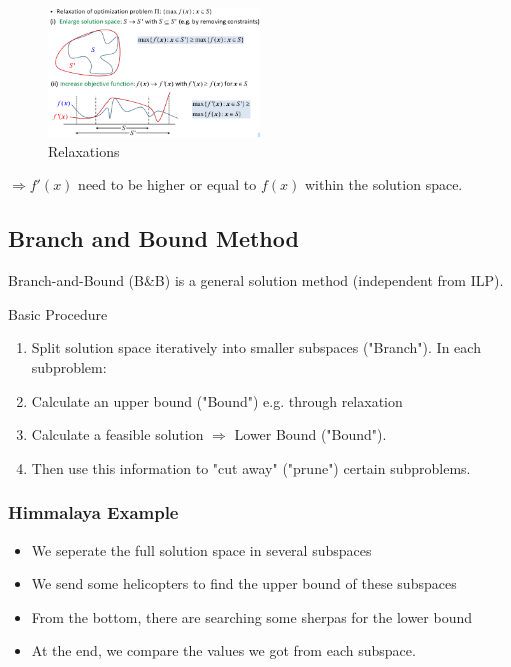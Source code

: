\begin{figure}[H]
\centering
\includegraphics[width=0.5\textwidth]{figures/relaxations.png}
\caption{Relaxations}
\end{figure}

$\Rightarrow f'(x)$ need to be higher or equal to $f(x)$ within the solution space.

\subsection{Branch and Bound Method}
Branch-and-Bound (B\&B) is a general solution method (independent from ILP). 

Basic Procedure
\begin{enumerate}
    \item Split solution space iteratively into smaller subspaces ("Branch"). In each subproblem:
    \item Calculate an upper bound ("Bound") e.g. through relaxation
    \item Calculate a feasible solution $\Rightarrow$ Lower Bound ("Bound").
    \item Then use this information to "cut away" ("prune") certain subproblems.
\end{enumerate}

\clearpage
\subsubsection{Himmalaya Example}

\begin{itemize}
    \item We seperate the full solution space in several subspaces
    \item We send some helicopters to find the upper bound of these subspaces
    \item From the bottom, there are searching some sherpas for the lower bound
    \item At the end, we compare the values we got from each subspace.
\end{itemize}

